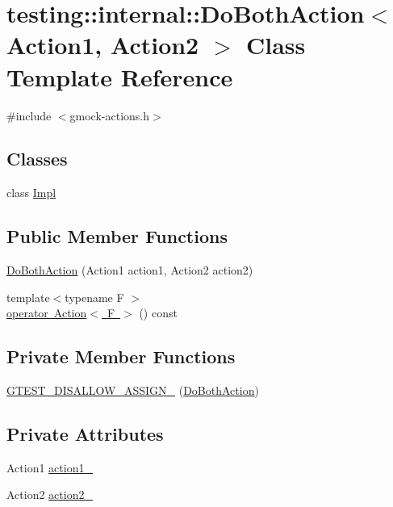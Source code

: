 \hypertarget{classtesting_1_1internal_1_1_do_both_action}{}\section{testing\+::internal\+::Do\+Both\+Action$<$ Action1, Action2 $>$ Class Template Reference}
\label{classtesting_1_1internal_1_1_do_both_action}


{\ttfamily \#include $<$gmock-\/actions.\+h$>$}

\subsection*{Classes}
\begin{DoxyCompactItemize}
\item 
class \mbox{\hyperlink{classtesting_1_1internal_1_1_do_both_action_1_1_impl}{Impl}}
\end{DoxyCompactItemize}
\subsection*{Public Member Functions}
\begin{DoxyCompactItemize}
\item 
\mbox{\hyperlink{classtesting_1_1internal_1_1_do_both_action_a55727c4dbdc1816ba6f1fe124e96088b}{Do\+Both\+Action}} (Action1 action1, Action2 action2)
\item 
{\footnotesize template$<$typename F $>$ }\\\mbox{\hyperlink{classtesting_1_1internal_1_1_do_both_action_a35733e2f117daad110bfbd3de84634a6}{operator Action$<$ F $>$}} () const
\end{DoxyCompactItemize}
\subsection*{Private Member Functions}
\begin{DoxyCompactItemize}
\item 
\mbox{\hyperlink{classtesting_1_1internal_1_1_do_both_action_a3428a1598ba58759f1a3f7d4443d6490}{G\+T\+E\+S\+T\+\_\+\+D\+I\+S\+A\+L\+L\+O\+W\+\_\+\+A\+S\+S\+I\+G\+N\+\_\+}} (\mbox{\hyperlink{classtesting_1_1internal_1_1_do_both_action}{Do\+Both\+Action}})
\end{DoxyCompactItemize}
\subsection*{Private Attributes}
\begin{DoxyCompactItemize}
\item 
Action1 \mbox{\hyperlink{classtesting_1_1internal_1_1_do_both_action_af747366f4d0117d1058c6288bb152122}{action1\+\_\+}}
\item 
Action2 \mbox{\hyperlink{classtesting_1_1internal_1_1_do_both_action_a414a3fe2381da32b235524338bbb592e}{action2\+\_\+}}
\end{DoxyCompactItemize}



